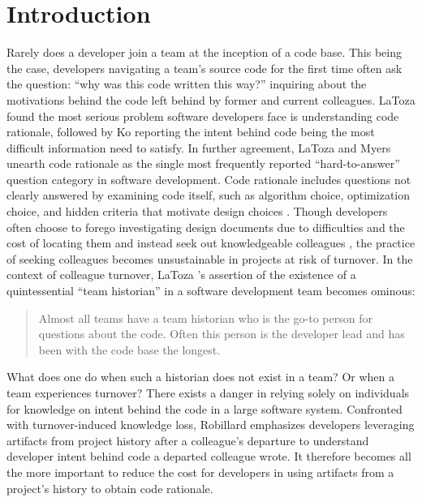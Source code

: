 
\chapter{Introduction}
\label{ch:Introduction}


Rarely does a developer join a team at the inception of a code base. 
This being the case, developers navigating a team's source code for the first time often ask the question: ``why was this code written this way?'' inquiring about the motivations behind the code left behind by former and current colleagues.
LaToza \etal \cite{latoza_maintaining_2006} found the most serious problem software developers face is understanding code rationale, followed by Ko \etal \cite{ko_information_2007} reporting the intent behind code being the most difficult information need to satisfy. 
In further agreement, LaToza and Myers \cite{latoza_hard-answer_2010} unearth code rationale as the single most frequently reported “hard-to-answer” question category in software development. 
Code rationale includes questions not clearly answered by examining code itself, such as algorithm choice, optimization choice, and hidden criteria that motivate design choices \cite{latoza_hard-answer_2010}. 
Though developers often choose to forego investigating design documents due to difficulties and the cost of locating them and instead seek out knowledgeable colleagues \cite{latoza_maintaining_2006}, the practice of seeking colleagues becomes unsustainable in projects at risk of turnover. 
In the context of colleague turnover, LaToza \etal 's assertion of the existence of a quintessential ``team historian'' in a software development team \cite{latoza_maintaining_2006} becomes ominous:

\begin{quote}
Almost all teams have a team historian who is the go-to person for questions about the
code. Often this person is the developer lead and has been with the code base the longest.
\end{quote}

What does one do when such a historian does not exist in a team? Or when a team experiences turnover?
There exists a danger in relying solely on individuals for knowledge on intent behind the code in a large software system.
Confronted with turnover-induced knowledge loss, Robillard \cite{robillard_turnover-induced_2021} emphasizes developers leveraging artifacts from project history after a colleague’s departure to understand developer intent behind code a departed colleague wrote. 
It therefore becomes all the more important to reduce the cost for developers in using artifacts from a project's history to obtain code rationale. 

